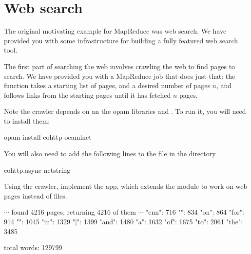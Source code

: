 \documentclass{pset}
\begin{document}
\begin{ocaml}
\end{ocaml}

\newpage{}
\part{Web search}

The original motivating example for MapReduce was web search.  We have provided
you with some infrastructure for building a fully featured web search tool.

The first part of searching the web involves crawling the web to find pages to
search.  We have provided you with a MapReduce job that does just that: the
function  takes a starting list of pages, and
a desired number of pages $n$, and follows links from the
starting pages until it has fetched $n$ pages.

\begin{note}{Note} the crawler depends on an the opam libraries
 and .  To run it, you will
need to install them:
\begin{ocaml}
opam install cohttp ocamlnet
\end{ocaml}
You will also need to add the following lines to the
 file in the 
directory
\begin{ocaml}
cohttp.async
netstring
\end{ocaml}
\end{note}


Using the crawler, implement the  app, which extends the
 module to work on web pages instead of files.

\begin{ocaml}
$\cdots$
found 4216 pages, returning 4216 of them
$\cdots$
"cnn":          716
"{":            834
"on":           864
"for":          914
"}":            1045
"in":           1329
"|":            1399
"and":          1480
"a":            1632
"of":           1675
"to":           2061
"the":          3485

total words: 129799
\end{ocaml}


\end{document}

